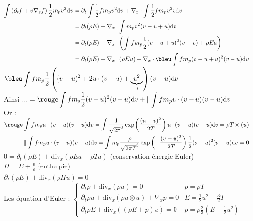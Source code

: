 \documentclass[12pt,a4paper]{article}
\begin{document}
\begin{enumerate}
\hspace*{.5cm}\begin{minipage}[t]{18cm}
	$\begin{aligned}
		\displaystyle\int \left(\partial_t f + v\nabla_x f\right)\frac12 m_p v^2 \mathrm dv &= \partial_t\int \frac12f m_p v^2\mathrm dv + \nabla_x \cdot \int \frac12 fm_p  v^2 v \mathrm dv\\
		&=\partial_t(\rho E) +\nabla_x \cdot \int m_p v^2  (v-u+u)\mathrm dv \\
		&=\partial_t (\rho E) + \nabla_x\cdot\left(\int fm_p \frac12 (v-u+u)^2 (v-u) + \rho E u\right)\\
		&=\partial_t(\rho E) + \nabla_x\cdot(\rho E u)+\nabla_x\cdot\bleu \int fm_p(v-u+u)^2 (v-u)\mathrm dv
	\end{aligned}$\\
	$\displaystyle\bleu\int fm_p \frac12\left((v-u)^2+2u\cdot(v-u) + \underbrace{u^2}_0\right) (v-u)\mathrm dv$\\
	
	Ainsi $...=\displaystyle\rouge\int fm_p \frac12 (v-u)^2(v-u)\mathrm dv  + \Vert\int fm_p u\cdot(v-u)(v-u)\mathrm dv$\\
	Or : $\begin{aligned}[t]
		\displaystyle\rouge\int fm_p u\cdot(v-u)(v-u) \mathrm dv = \int \dfrac1{\sqrt{2\pi}^3}\exp\left(\dfrac{(u-v)^2}{2T}\right)u\cdot(v-u) (v-u) \mathrm dv = \rho T\times (u)\\
		\Vert\int fm_p u\cdot(v-u)(v-u)\mathrm dv = \int m_p \dfrac\rho{\sqrt{2\pi T}^3}\exp\left(-\dfrac{(v-u)^2}{2T}\right)\dfrac12(v-u)^2(v-u) \mathrm dv=0
	\end{aligned}$\\
	
	$0 = \partial_t(\rho E) + \mathrm{div}_x(\rho Eu+\rho Tu)$ (conservation énergie Euler) \\
	$H = E+\frac p\rho$ (enthalpie)\\
	$\partial_t(\rho E) + \mathrm{div}_x(\rho H u) = 0$\\
	
	Les équation d'Euler : $\begin{cases}
		\partial_t\rho + \mathrm{div}_x(\rho u) = 0 & p = \rho T\\
		\partial_t\rho u +\mathrm{div}_x(\rho u \otimes u) + \nabla_x p = 0 & E = \frac12 u^2 + \frac32 T\\
		\partial_t\rho E + \mathrm{div}_x((\rho E+p)u) = 0 & p = \rho\frac 23(E-\frac12 u^2)
	\end{cases}$
\end{minipage}
\end{enumerate}
\end{document}
